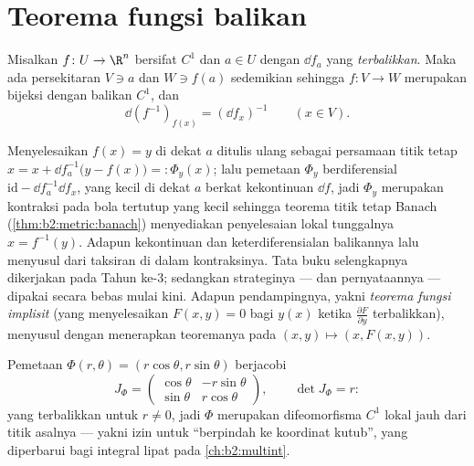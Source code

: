 \section{Teorema fungsi balikan}

\begin{theorem}\label{thm:b2:diffcalc:inverse}
Misalkan $f \colon U \to \R^n$ bersifat $C^1$ dan $a \in U$ dengan $\dd f_a$
yang \emph{terbalikkan}. Maka ada persekitaran  $V \ni a$ dan $W
\ni f(a)$ sedemikian sehingga $f \colon V \to W$ merupakan bijeksi dengan
balikan $C^1$, dan
\[
\dd (f^{-1})_{f(x)} = (\dd f_x)^{-1} \qquad (x \in V).
\]
\end{theorem}
\admitted

\begin{remark}
Menyelesaikan $f(x) = y$ di dekat $a$ ditulis ulang sebagai persamaan titik tetap
$x = x + \dd f_a^{-1}\bigl(y - f(x)\bigr) =: \Phi_y(x)$; lalu pemetaan
$\Phi_y$ berdiferensial $\mathrm{id} - \dd f_a^{-1}\dd f_x$,
yang kecil di dekat $a$ berkat kekontinuan $\dd f$, jadi $\Phi_y$ merupakan
kontraksi pada bola tertutup yang kecil sehingga teorema titik tetap Banach
(\cref{thm:b2:metric:banach}) menyediakan penyelesaian lokal
tunggalnya $x = f^{-1}(y)$. Adapun kekontinuan dan keterdiferensialan
balikannya lalu menyusul dari taksiran di dalam kontraksinya. Tata buku
selengkapnya dikerjakan pada Tahun ke-3; sedangkan strateginya --- dan
pernyataannya --- dipakai secara bebas mulai kini. Adapun pendampingnya, yakni
\emph{teorema fungsi implisit} (yang menyelesaikan $F(x, y) = 0$ bagi $y(x)$
ketika $\frac{\partial F}{\partial y}$ terbalikkan), menyusul dengan
menerapkan teoremanya pada $(x, y) \mapsto (x, F(x,y))$.
\end{remark}

\begin{example}\label{ex:b2:diffcalc:polar}
Pemetaan $\Phi(r, \theta) = (r\cos\theta, r\sin\theta)$ berjacobi
\[
J_\Phi = \begin{pmatrix} \cos\theta & -r\sin\theta\\ \sin\theta &
r\cos\theta \end{pmatrix},
\qquad \det J_\Phi = r :
\]
yang terbalikkan untuk $r \neq 0$, jadi $\Phi$ merupakan difeomorfisma $C^1$
lokal jauh dari titik asalnya --- yakni izin untuk ``berpindah ke
koordinat kutub'', yang diperbarui bagi integral lipat pada
\cref{ch:b2:multint}.
\end{example}

